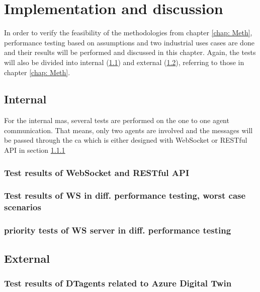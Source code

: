 \chapter{Implementation and discussion} \label{chap: Result}

In order to verify the feasibility of the methodologies from chapter \ref{chap: Meth}, 
performance testing based on assumptions and two industrial uses cases 
are done and their results will be performed and discussed in this chapter. 
Again, the tests will also be divided into internal (\ref{chap: Result-Internal}) 
and external (\ref{chap: Result-External}), referring to those in chapter \ref{chap: Meth}.

\section{Internal}\label{chap: Result-Internal}
For the internal \gls{mas}, several tests are performed on the one to one 
agent communication. That means, only two agents are involved and the messages 
will be passed through the \gls{ca} which is either designed with WebSocket 
or RESTful API in section \ref{chap: Result-RestFUL_WS}
\subsection{Test results of WebSocket and RESTful API} \label{chap: Result-RestFUL_WS}

\subsection{Test results of WS in diff. performance testing, worst case scenarios} \label{chap: Result-WS}

\subsection{priority tests of WS server in diff. performance testing} \label{chap: Result-priority}

\section{External}\label{chap: Result-External}

\subsection{Test results of DTagents related to Azure Digital Twin} \label{chap: Result-DT}